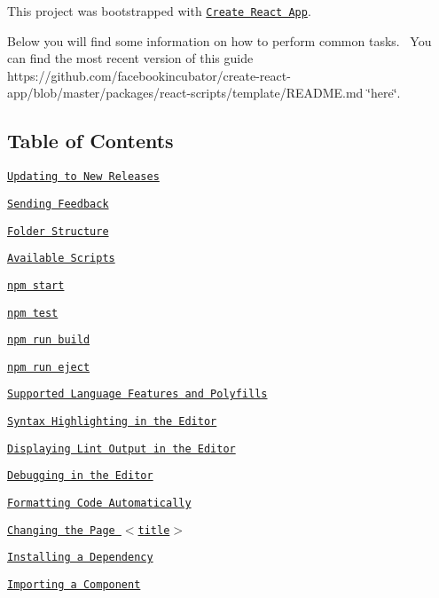 This project was bootstrapped with \href{https://github.com/facebookincubator/create-react-app}{\tt Create React App}.

Below you will find some information on how to perform common tasks.~\newline
 You can find the most recent version of this guide https\+://github.com/facebookincubator/create-\/react-\/app/blob/master/packages/react-\/scripts/template/\+R\+E\+A\+D\+M\+E.\+md \char`\"{}here\char`\"{}.

\subsection*{Table of Contents}


\begin{DoxyItemize}
\item \href{#updating-to-new-releases}{\tt Updating to New Releases}
\item \href{#sending-feedback}{\tt Sending Feedback}
\item \href{#folder-structure}{\tt Folder Structure}
\item \href{#available-scripts}{\tt Available Scripts}
\begin{DoxyItemize}
\item \href{#npm-start}{\tt npm start}
\item \href{#npm-test}{\tt npm test}
\item \href{#npm-run-build}{\tt npm run build}
\item \href{#npm-run-eject}{\tt npm run eject}
\end{DoxyItemize}
\item \href{#supported-language-features-and-polyfills}{\tt Supported Language Features and Polyfills}
\item \href{#syntax-highlighting-in-the-editor}{\tt Syntax Highlighting in the Editor}
\item \href{#displaying-lint-output-in-the-editor}{\tt Displaying Lint Output in the Editor}
\item \href{#debugging-in-the-editor}{\tt Debugging in the Editor}
\item \href{#formatting-code-automatically}{\tt Formatting Code Automatically}
\item \href{#changing-the-page-title}{\tt Changing the Page {\ttfamily $<$title$>$}}
\item \href{#installing-a-dependency}{\tt Installing a Dependency}
\item \href{#importing-a-component}{\tt Importing a Component}

\end{DoxyItemize}
